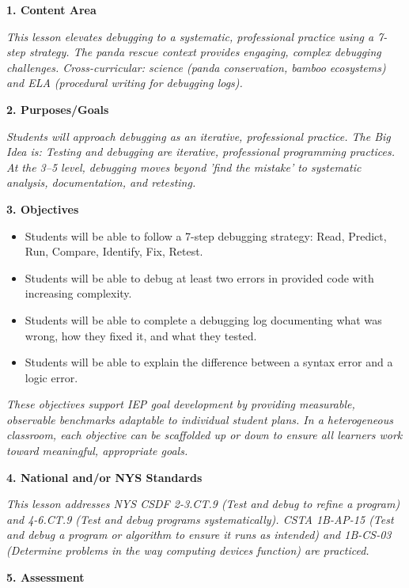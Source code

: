 \documentclass[11pt,letterpaper]{article}
\begin{document}
\textbf{1. Content Area}

\textit{This lesson elevates debugging to a systematic, professional practice using a 7-step strategy. The panda rescue context provides engaging, complex debugging challenges. Cross-curricular: science (panda conservation, bamboo ecosystems) and ELA (procedural writing for debugging logs).}

\textbf{2. Purposes/Goals}

\textit{Students will approach debugging as an iterative, professional practice. The Big Idea is: Testing and debugging are iterative, professional programming practices. At the 3--5 level, debugging moves beyond 'find the mistake' to systematic analysis, documentation, and retesting.}

\textbf{3. Objectives}

\begin{itemize}
  \item Students will be able to follow a 7-step debugging strategy: Read, Predict, Run, Compare, Identify, Fix, Retest.

  \item Students will be able to debug at least two errors in provided code with increasing complexity.

  \item Students will be able to complete a debugging log documenting what was wrong, how they fixed it, and what they tested.

  \item Students will be able to explain the difference between a syntax error and a logic error.
\end{itemize}

\textit{These objectives support IEP goal development by providing measurable, observable benchmarks adaptable to individual student plans. In a heterogeneous classroom, each objective can be scaffolded up or down to ensure all learners work toward meaningful, appropriate goals.}

\textbf{4. National and/or NYS Standards}

\textit{This lesson addresses NYS CSDF 2-3.CT.9 (Test and debug to refine a program) and 4-6.CT.9 (Test and debug programs systematically). CSTA 1B-AP-15 (Test and debug a program or algorithm to ensure it runs as intended) and 1B-CS-03 (Determine problems in the way computing devices function) are practiced.}

\newpage

\textbf{5. Assessment}
\end{document}
